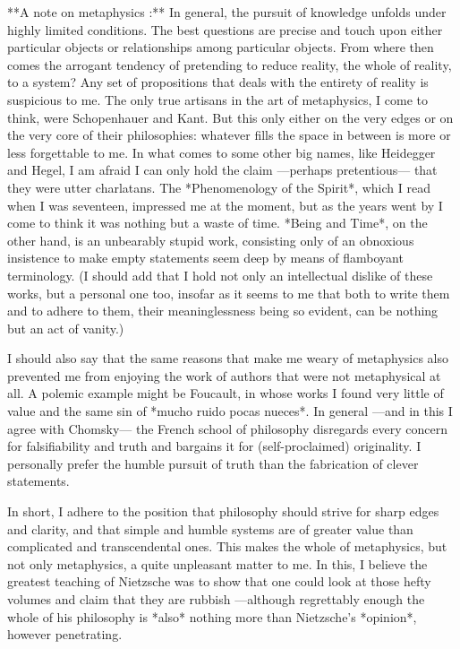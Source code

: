 \documentclass[a4paper]{article}
\begin{document}
**A note on metaphysics :** In general, the pursuit of knowledge unfolds under
highly limited conditions. The best questions are precise and touch upon either
particular objects or relationships among particular objects. From where then
comes the arrogant tendency of pretending to reduce reality, the whole of
reality, to a system? Any set of propositions that deals with the entirety of
reality is suspicious to me. The only true artisans in the art of metaphysics, I
come to think, were Schopenhauer and Kant. But this only either on the very
edges or on the very core of their philosophies: whatever fills the space
in between is more or less forgettable to me. In what comes to some other big names,
like Heidegger and Hegel, I am afraid I can only hold the claim —perhaps
pretentious— that they were utter charlatans. The *Phenomenology of the Spirit*,
which I read when I was seventeen, impressed me at the moment, but as the years
went by I come to think it was nothing but a waste of time. *Being and Time*, on
the other hand, is an unbearably stupid work, consisting only of an obnoxious
insistence to make empty statements seem deep by means of
flamboyant terminology. (I should add that I hold not only an intellectual
dislike of these works, but a personal one too, insofar as it seems to me that
both to write them and to adhere to them, their meaninglessness being so
evident, can be nothing but an act of vanity.)

I should also say that the same reasons that make me weary of metaphysics also
prevented me from enjoying the work of authors that were not metaphysical at
all. A polemic example might be Foucault, in whose works I found very little of
value and the same sin of *mucho ruido pocas nueces*. In general —and in this I
agree with Chomsky— the French school of philosophy disregards every concern for
falsifiability and truth and bargains it for (self-proclaimed) originality. I
personally prefer the humble pursuit of truth than the fabrication of clever
statements.

In short, I adhere to the position that philosophy should strive for sharp
edges and clarity, and that simple and humble systems are of greater value than
complicated and transcendental ones. This makes the whole of metaphysics, but not
only metaphysics, a quite unpleasant matter to me. In this, I believe the
greatest teaching of Nietzsche was to show that one could look at those hefty
volumes and claim that they are rubbish —although regrettably enough the whole
of his philosophy is *also* nothing more than Nietzsche's *opinion*, however
penetrating.
\end{document}
